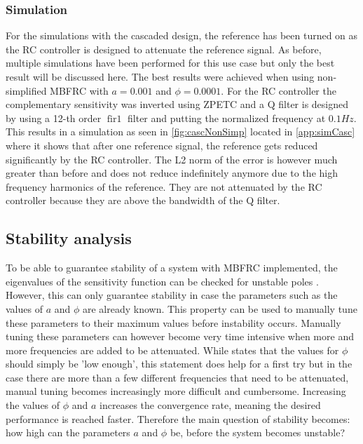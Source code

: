 \documentclass[journal]{IEEEtran}
\begin{document}
\subsubsection{Simulation}\label{sssec:CascadedSim}
For the simulations with the cascaded design, the reference has been turned on as the RC controller is designed to attenuate the reference signal. As before, multiple simulations have been performed for this use case but only the best result will be discussed here. The best results were achieved when using non-simplified MBFRC with $a = 0.001$ and $\phi = 0.0001$. For the RC controller the complementary sensitivity was inverted using ZPETC \cite{Tomizuka_1987} and a Q filter is designed by using a 12-th order $\operatorname{fir1}$ filter and putting the normalized frequency at $0.1Hz$. This results in a simulation as seen in \autoref{fig:cascNonSimp} located in \autoref{app:simCasc} where it shows that after one reference signal, the reference gets reduced significantly by the RC controller. The L2 norm of the error is however much greater than before and does not reduce indefinitely anymore due to the high frequency harmonics of the reference. They are not attenuated by the RC controller because they are above the bandwidth of the Q filter.

\subsection{Stability analysis}
To be able to guarantee stability of a system with MBFRC implemented, the eigenvalues of the sensitivity function can be checked for unstable poles \cite{zwaans_frequency_nodate}. However, this can only guarantee stability in case the parameters such as the values of $a$ and $\phi$ are already known. This property can be used to manually tune these parameters to their maximum values before instability occurs. Manually tuning these parameters can however become very time intensive when more and more frequencies are added to be attenuated. While \cite{shi_small_2014} states that the values for $\phi$ should simply be 'low enough', this statement does help for a first try but in the case there are more than a few different frequencies that need to be attenuated, manual tuning becomes increasingly more difficult and cumbersome. Increasing the values of $\phi$ and $a$ increases the convergence rate, meaning the desired performance is reached faster. Therefore the main question of stability becomes: how high can the parameters $a$ and $\phi$ be, before the system becomes unstable?
\end{document}
